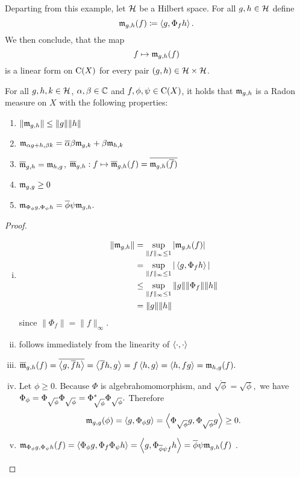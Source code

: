 Departing from this example, let $\mathcal{H}$ be a Hilbert space.
For all $g , h \in \mathcal{H}$ define
\[
 \mathfrak{m}_{g, h} (f) \coloneqq \left\langle g, \Phi_f h \right\rangle.
\]
We then conclude, that the map 
\[
 f \mapsto \mathfrak{m}_{g,h} (f)
\]
is a linear form on $\operatorname{C} (X)$ for every pair $(g, h) \in \mathcal{H} \times \mathcal{H}$.
\begin{thrm} \label{measureproperties}
For all $g, h,k \in \mathcal{H}$, $\alpha, \beta \in \mathbb{C}$ and $f, \phi, \psi \in 
\operatorname{C}(X)$, it holds that $\mathfrak{m}_{g,h}$ is a Radon measure on $X$ with the following 
properties:
\begin{enumerate}[{(}i{)}]
 \item $\| \mathfrak{m}_{g,h}\| \leq \|g\| \|h\|$
 \item $\mathfrak{m}_{\alpha g + h, \beta k} = \overline{\alpha}\beta \mathfrak{m}_{g,k} + 
 \beta \mathfrak{m}_{h,k}$
 \item $\overline{\mathfrak{m}}_{g,h} = \mathfrak{m}_{h,g}$, $\overline{\mathfrak{m}}_{g,h} : 
 f \mapsto \overline{\mathfrak{m}}_{g,h}(f) = \overline{\mathfrak{m}_{g,h}(\overline{f})}$
 \item $\mathfrak{m}_{g,g} \geq 0$
 \item $\mathfrak{m}_{\Phi_\phi g, \Phi_\psi h} = \overline{\phi} \psi \mathfrak{m}_{g,h}.$
\end{enumerate}

\end{thrm}

\begin{proof}
 \begin{enumerate}[(i)]
  \item \begin{align*}
         \| \mathfrak{m}_{g,h} \| &= \sup\limits_{\| f \| _\infty \leq 1} | \mathfrak{m}_{g,h}(f) | \\
			&= \sup\limits_{\| f \| _\infty \leq 1} | \left\langle g, \Phi_f h \right\rangle | \\
			&\leq \sup\limits_{\| f \| _\infty \leq 1} \| g \| \|\Phi_f \| \| h\| \\
			&= \|g\| \|h\|
        \end{align*}
  since $\|\Phi_f \| =\| f \|_\infty$.
 \item follows immediately from the linearity of $\left\langle \cdot , \cdot \right\rangle$
 
 \item $\overline{\mathfrak{m}}_{g,h}(f) = \overline{\left\langle g, \overline{f}h \right\rangle} = 
       \left\langle \overline{f}h ,g \right\rangle =	f\left\langle h,g \right\rangle = \left\langle h, fg \right\rangle = \mathfrak{m}_{h,g}(f).$
	
       \item Let $\phi \geq 0$. Because $\Phi$ is algebrahomomorphism, and 
       $\overline{\sqrt{\phi}} = \sqrt{\phi},$ we have 
	$ \Phi_\phi = \Phi_{\sqrt{\phi}} \Phi_{\sqrt{\phi}} =
	  \Phi^{*}_{\sqrt{\phi}} \Phi_{\sqrt{\phi}}.$
	Therefore 
	\[\mathfrak{m}_{g,g}(\phi) = \left\langle g, \Phi_\phi g \right\rangle = \left\langle \Phi_{\sqrt{\phi}}g,
	\Phi_{\sqrt{\phi}}g \right\rangle \geq 0. \]
	
 \item	$\mathfrak{m}_{\Phi_\phi g, \Phi_\psi h} (f ) = \left\langle \Phi_\phi g, \Phi_f 
	\Phi_\psi h \right\rangle = \left\langle g , \Phi_{\overline{\phi} \psi f} h  \right\rangle = \overline{\phi}
	\psi \mathfrak{m}_{g,h}(f)$ .

\end{enumerate}

\end{proof}

